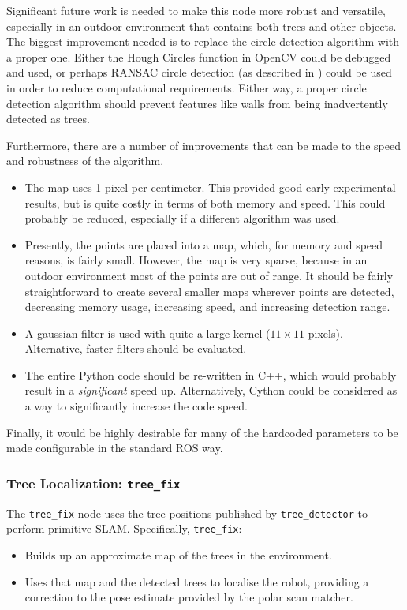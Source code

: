 \documentclass[12pt,oneside,a4paper]{book}
\begin{document}
Significant future work is needed to make this node more robust and
versatile, especially in an outdoor environment that contains both
trees and other objects. The biggest improvement needed is to replace
the circle detection algorithm with a proper one. Either the Hough
Circles function in OpenCV could be debugged and used, or perhaps
RANSAC circle detection (as described in \cite{ransac}) could be
used in order to reduce computational requirements. Either way, a
proper circle detection algorithm should prevent features like walls
from being inadvertently detected as trees.

Furthermore, there are a number of improvements that can be made to
the speed and robustness of the algorithm.
\begin{itemize}
\item The map uses 1 pixel per centimeter. This provided good early
  experimental results, but is quite costly in terms of both memory
  and speed. This could probably be reduced, especially if a different
  algorithm was used.
\item Presently, the points are placed into a map, which, for memory
  and speed reasons, is fairly small. However, the map is very sparse,
  because in an outdoor environment most of the points are out of range.
  It should be fairly straightforward to create several smaller maps
  wherever points are detected, decreasing memory usage, increasing
  speed, and increasing detection range.
\item A gaussian filter is used with quite a large kernel ($11 \times
  11$ pixels). Alternative, faster filters should be evaluated.
\item The entire Python code should be re-written in C++, which would
  probably result in a \emph{significant} speed up. Alternatively,
  Cython could be considered as a way to significantly increase the
  code speed.
\end{itemize}

Finally, it would be highly desirable for many of the hardcoded
parameters to be made configurable in the standard ROS way.
\newpage
\subsubsection{Tree Localization: \texttt{tree\_fix}}
\label{sec:tree_fix}

The \texttt{tree\_fix} node uses the tree positions published by
\texttt{tree\_detector} to perform primitive SLAM. Specifically, \texttt{tree\_fix}:
\begin{itemize}
\item Builds up an approximate map of the trees in the environment.
\item Uses that map and the detected trees to localise the robot,
  providing a correction to the pose estimate provided by the polar
  scan matcher.
\end{itemize}
\end{document}
